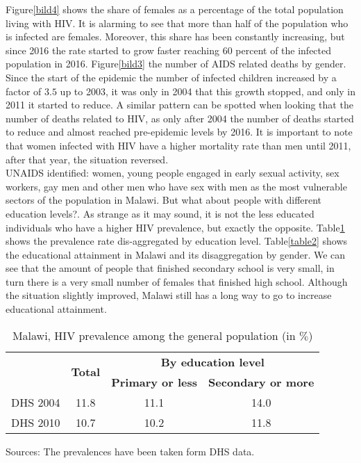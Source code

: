 Figure\ref{bild4} shows the share of females as a percentage of the total population living with HIV. It is alarming to see that more than half of the population who is infected are females. Moreover, this share has been constantly increasing, but since 2016 the rate started to grow faster reaching 60 percent of the infected population in 2016. Figure\ref{bild3} the number of AIDS related deaths by gender. Since the start of the epidemic the number of infected children increased by a factor of $3.5$ up to 2003, it was only in 2004 that this growth stopped, and only in 2011 it started to reduce. A similar pattern can be spotted when looking that the number of deaths related to HIV, as only after 2004 the number of deaths started to reduce and almost reached pre-epidemic levels by 2016. It is important to note that women infected with HIV have a higher mortality rate than men until 2011, after that year, the situation reversed.\\     

UNAIDS identified: women, young people engaged in early sexual activity, sex workers, gay men and other men who have sex with men as the most vulnerable sectors of the population in Malawi. But what about people with different education levels?. As strange as it may sound, it is not the less educated individuals who have a higher HIV prevalence, but exactly the opposite. Table\ref{table1} shows the prevalence rate dis-aggregated by education level. Table\ref{table2} shows the educational attainment in Malawi and its disaggregation by gender. We can see that the amount of people that finished secondary school is very small, in turn there is a very small number of females that finished high school. Although the situation slightly improved, Malawi still has a long way to go to increase educational attainment.\\

\begin{table}[H]
\centering
\caption{Malawi, HIV prevalence among the general population (in $\%$)}
\label{table1}
\begin{tabular}{c|c|c|c}
\hline
\multirow{2}{*}{\textbf{}}&\multirow{2}{*}{\textbf{Total}}&\multicolumn{2}{|c}{\textbf{By education level}}\\
\cline{3-4}
 &   &  \textbf{Primary or less}&  \textbf{Secondary or more}\\
 \hline \hline
 DHS 2004& 11.8 & 11.1 & 14.0 \\
 [0.3em]
 DHS 2010    & 10.7 & 10.2 & 11.8 \\
 [0.3em]
\hline \hline
\end{tabular}
\begin{flushleft}
Sources: The prevalences have been taken form DHS data.
\end{flushleft}
\end{table}

